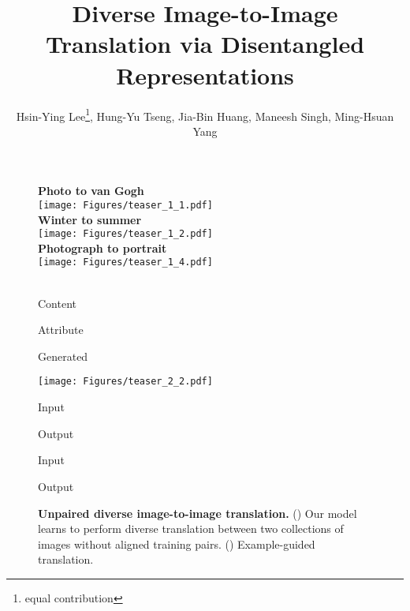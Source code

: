\documentclass[runningheads]{llncs}
\makeatletter
\newcommand{\tb}[1]{\textbf{#1}}
\newcommand{\mpage}[2]
{
\begin{minipage}[t]{#1\linewidth}\centering
#2
\end{minipage}
}
\newcommand{\printfnsymbol}[1]{\textsuperscript{\@fnsymbol{#1}}}
\makeatother
\begin{document}
\pagestyle{headings}
\mainmatter
\def\ECCV18SubNumber{153}  

\title{Diverse Image-to-Image Translation via Disentangled Representations} 



\author{Hsin-Ying Lee\thanks{equal contribution}, Hung-Yu Tseng\printfnsymbol{1}, Jia-Bin Huang, Maneesh Singh, Ming-Hsuan Yang}


\maketitle

\vspace{-7mm}
\begin{figure}[th]
\centering 
\mpage{0.535}{
\tb{Photo to van Gogh}\\
\texttt{[image: Figures/teaser\_1\_1.pdf]} \\
\tb{Winter to summer}\\
\texttt{[image: Figures/teaser\_1\_2.pdf]} \\
\tb{Photograph to portrait}\\
\texttt{[image: Figures/teaser\_1\_4.pdf]} \\
 \hfill \\
} 
\hfill
\mpage{0.43}
{


\mpage{0.3}{Content}\hfill\mpage{0.3}{Attribute}\hfill\mpage{0.3}{Generated}
\texttt{[image: Figures/teaser\_2\_2.pdf]} \\
}
\vspace{-5.5mm}

\mpage{0.52}{
\mpage{0.25}{Input}\hfill\mpage{0.7}{Output}
}
\hfill
\mpage{0.45}{
\mpage{0.65}{Input}\hfill\mpage{0.3}{Output}
}

 \vspace{-5mm}
    \caption{\textbf{Unpaired diverse image-to-image translation.}
(\textit{}) Our model learns to perform diverse translation between two collections of images without aligned training pairs.
(\textit{}) Example-guided translation.
}
    \vspace{-13mm}
    \label{figure:teaser}
\end{figure}
\end{document}
